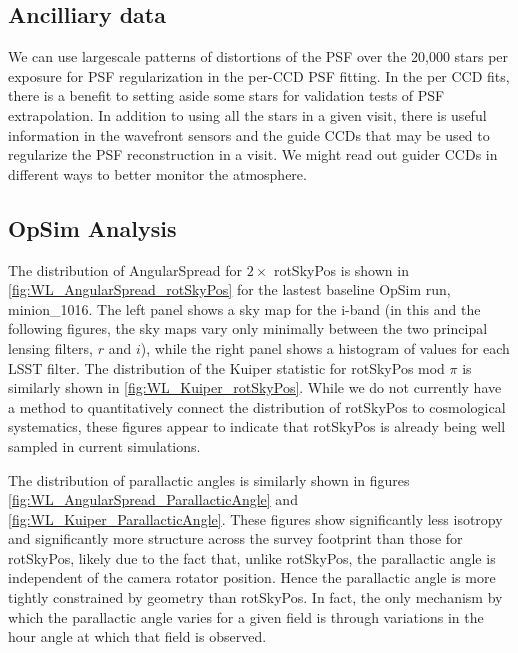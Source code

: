 \subsection{Ancilliary data}

We can use largescale patterns of distortions of the PSF over the 20,000 stars per exposure for
PSF regularization in the per-CCD PSF fitting. In the per CCD fits, there is a benefit to
setting aside some stars for validation tests of PSF extrapolation.
In addition to using all the stars in a given visit, there is useful information in the
wavefront sensors and the guide CCDs that may be used to regularize the PSF
reconstruction in a visit. We might read out guider CCDs in different ways to better
monitor the atmosphere.


\subsection{OpSim Analysis}

The distribution of AngularSpread for $2 \times$ rotSkyPos is shown in
\autoref{fig:WL_AngularSpread_rotSkyPos} for the lastest baseline OpSim run, minion\_1016.  The left
panel shows a sky map for the i-band (in this and the following figures, the sky maps vary only
minimally between the two principal lensing filters, $r$ and $i$), while the right panel shows a
histogram of values for each LSST filter.  The distribution of the Kuiper statistic for rotSkyPos
mod $\pi$ is similarly shown in \autoref{fig:WL_Kuiper_rotSkyPos}.  While we do not currently have a
method to quantitatively connect the distribution of rotSkyPos to cosmological systematics, these
figures appear to indicate that rotSkyPos is already being well sampled in current simulations.

The distribution of parallactic angles is similarly shown in figures
\autoref{fig:WL_AngularSpread_ParallacticAngle} and \autoref{fig:WL_Kuiper_ParallacticAngle}.  These
figures show significantly less isotropy and significantly more structure across the survey
footprint than those for rotSkyPos, likely due to the fact that, unlike rotSkyPos, the parallactic
angle is independent of the camera rotator position.  Hence the parallactic angle is more tightly
constrained by geometry than rotSkyPos.  In fact, the only mechanism by which the parallactic angle
varies for a given field is through variations in the hour angle at which that field is observed.


